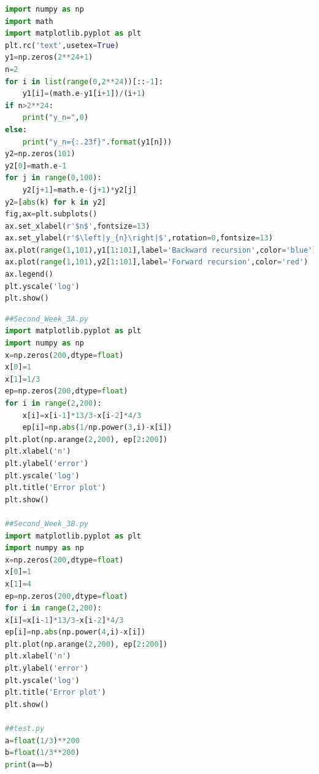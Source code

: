 \documentclass[a4paper,11pt,notitlepage]{article}
\begin{document}
\begin{lstlisting}[language=Python,caption={Second Week 2.py}]
import numpy as np
import math
import matplotlib.pyplot as plt
plt.rc('text',usetex=True)
y1=np.zeros(2**24+1)
n=2
for i in list(range(0,2**24))[::-1]:
    y1[i]=(math.e-y1[i+1])/(i+1)
if n>2**24:
    print("y_n=",0)
else:
    print("y_n={:.23f}".format(y1[n]))
y2=np.zeros(101)
y2[0]=math.e-1
for j in range(0,100):
    y2[j+1]=math.e-(j+1)*y2[j]
y2=[abs(k) for k in y2]
fig,ax=plt.subplots()
ax.set_xlabel(r'$n$',fontsize=13)
ax.set_ylabel(r'$\left|y_{n}\right|$',rotation=0,fontsize=13)
ax.plot(range(1,101),y1[1:101],label='Backward recursion',color='blue')
ax.plot(range(1,101),y2[1:101],label='Forward recursion',color='red')
ax.legend()
plt.yscale('log')
plt.show()
\end{lstlisting}

\begin{lstlisting}[language=Python,caption={Second Week 3},label={lst:1}]
##Second_Week_3A.py
import matplotlib.pyplot as plt
import numpy as np
x=np.zeros(200,dtype=float)
x[0]=1
x[1]=1/3
ep=np.zeros(200,dtype=float)
for i in range(2,200):
    x[i]=x[i-1]*13/3-x[i-2]*4/3
    ep[i]=np.abs(1/np.power(3,i)-x[i])
plt.plot(np.arange(2,200), ep[2:200])
plt.xlabel('n')
plt.ylabel('error')
plt.yscale('log')
plt.title('Error plot')
plt.show()

##Second_Week_3B.py
import matplotlib.pyplot as plt
import numpy as np
x=np.zeros(200,dtype=float)
x[0]=1
x[1]=4
ep=np.zeros(200,dtype=float)
for i in range(2,200):
x[i]=x[i-1]*13/3-x[i-2]*4/3
ep[i]=np.abs(np.power(4,i)-x[i])
plt.plot(np.arange(2,200), ep[2:200])
plt.xlabel('n')
plt.ylabel('error')
plt.yscale('log')
plt.title('Error plot')
plt.show()

##test.py
a=float(1/3)**200
b=float(1/3**200)
print(a==b)
\end{lstlisting}
\end{document}
